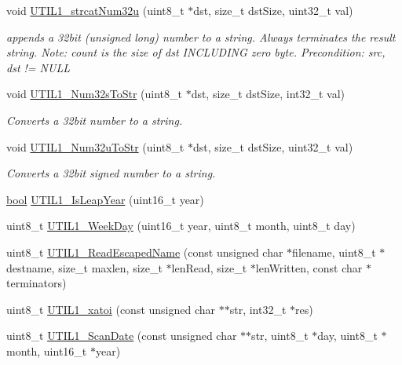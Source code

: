 \begin{DoxyCompactItemize}
void \hyperlink{group___u_t_i_l1__module_ga08c07e142fc2d6ee106ff74e058f8550}{U\+T\+I\+L1\+\_\+strcat\+Num32u} (uint8\+\_\+t $\ast$dst, size\+\_\+t dst\+Size, uint32\+\_\+t val)
\begin{DoxyCompactList}\small\item\em appends a 32bit (unsigned long) number to a string. Always terminates the result string. Note\+: count is the size of dst I\+N\+C\+L\+U\+D\+I\+NG zero byte. Precondition\+: src, dst != N\+U\+LL \end{DoxyCompactList}\item 
void \hyperlink{group___u_t_i_l1__module_ga446da30d25403706e07922522b5bb320}{U\+T\+I\+L1\+\_\+\+Num32s\+To\+Str} (uint8\+\_\+t $\ast$dst, size\+\_\+t dst\+Size, int32\+\_\+t val)
\begin{DoxyCompactList}\small\item\em Converts a 32bit number to a string. \end{DoxyCompactList}\item 
void \hyperlink{group___u_t_i_l1__module_ga47f18477d12c53ac4587abd039374498}{U\+T\+I\+L1\+\_\+\+Num32u\+To\+Str} (uint8\+\_\+t $\ast$dst, size\+\_\+t dst\+Size, uint32\+\_\+t val)
\begin{DoxyCompactList}\small\item\em Converts a 32bit signed number to a string. \end{DoxyCompactList}\item 
\hyperlink{group___p_e___types__module_ga97a80ca1602ebf2303258971a2c938e2}{bool} \hyperlink{group___u_t_i_l1__module_ga1f73f4b53f3d1e21f96d5deda3f72af6}{U\+T\+I\+L1\+\_\+\+Is\+Leap\+Year} (uint16\+\_\+t year)
\item 
uint8\+\_\+t \hyperlink{group___u_t_i_l1__module_ga85b76d9b76fdb9832eb8962a9d2952a8}{U\+T\+I\+L1\+\_\+\+Week\+Day} (uint16\+\_\+t year, uint8\+\_\+t month, uint8\+\_\+t day)
\item 
uint8\+\_\+t \hyperlink{group___u_t_i_l1__module_ga89ec13172fbce73f52312b5ea6a38ab3}{U\+T\+I\+L1\+\_\+\+Read\+Escaped\+Name} (const unsigned char $\ast$filename, uint8\+\_\+t $\ast$destname, size\+\_\+t maxlen, size\+\_\+t $\ast$len\+Read, size\+\_\+t $\ast$len\+Written, const char $\ast$terminators)
\item 
uint8\+\_\+t \hyperlink{group___u_t_i_l1__module_gaed1ee049df8475e8734cc57bd5eaffc4}{U\+T\+I\+L1\+\_\+xatoi} (const unsigned char $\ast$$\ast$str, int32\+\_\+t $\ast$res)
\item 
uint8\+\_\+t \hyperlink{group___u_t_i_l1__module_ga3338f42194049915b0a75e88ddfbfda8}{U\+T\+I\+L1\+\_\+\+Scan\+Date} (const unsigned char $\ast$$\ast$str, uint8\+\_\+t $\ast$day, uint8\+\_\+t $\ast$month, uint16\+\_\+t $\ast$year)

\end{DoxyCompactItemize}
